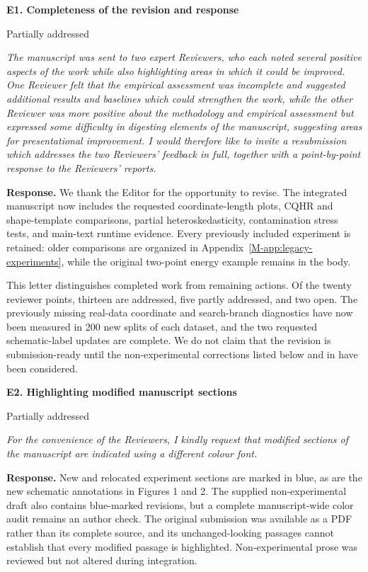 \documentclass[11pt]{article}
\newcommand{\msapp}[1]{Appendix~\ref*{M-#1}}
\newcommand{\point}[3]{\par\Needspace{7\baselineskip}\medskip
\noindent\parbox[t]{0.77\linewidth}{\textbf{#1}}\hfill
\parbox[t]{0.21\linewidth}{\raggedleft\small\sffamily #2}\par\nopagebreak
{\color{ReviewerBlue}\small\itshape #3\par}\textbf{Response.} }
\begin{document}
\point{E1. Completeness of the revision and response}{Partially addressed}{The manuscript was sent to two expert Reviewers, who each noted several
positive aspects of the work while also highlighting areas in which it
could be improved. One Reviewer felt that the empirical assessment was
incomplete and suggested additional results and baselines which could
strengthen the work, while the other Reviewer was more positive about the
methodology and empirical assessment but expressed some difficulty in
digesting elements of the manuscript, suggesting areas for presentational
improvement. I would therefore like to invite a resubmission which
addresses the two Reviewers' feedback in full, together with a
point-by-point response to the Reviewers' reports.}
\label{response:E1}
We thank the Editor for the opportunity to revise. The integrated manuscript now includes the requested coordinate-length plots, CQHR and shape-template comparisons, partial heteroskedasticity, contamination stress tests, and main-text runtime evidence. Every previously included experiment is retained: older comparisons are organized in \msapp{app:legacy-experiments}, while the original two-point energy example remains in the body.

This letter distinguishes completed work from remaining actions. Of the twenty reviewer points, thirteen are addressed, five partly addressed, and two open. The previously missing real-data coordinate and search-branch diagnostics have now been measured in 200 new splits of each dataset, and the two requested schematic-label updates are complete. We do not claim that the revision is submission-ready until the non-experimental corrections listed below and in  have been considered.

\point{E2. Highlighting modified manuscript sections}{Partially addressed}{For the convenience of the Reviewers, I kindly request that modified
sections of the manuscript are indicated using a different colour font.}
\label{response:E2}
New and relocated experiment sections are marked in blue, as are the new schematic annotations in Figures 1 and 2. The supplied non-experimental draft also contains blue-marked revisions, but a complete manuscript-wide color audit remains an author check. The original submission was available as a PDF rather than its complete source, and its unchanged-looking passages cannot establish that every modified passage is highlighted. Non-experimental prose was reviewed but not altered during integration.
\end{document}
